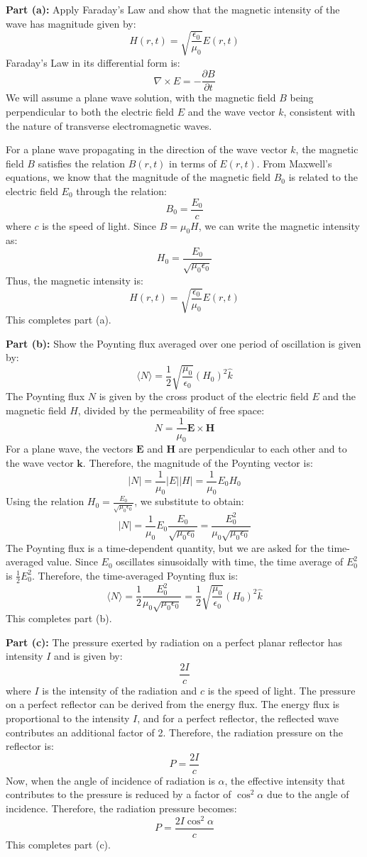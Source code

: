 \documentclass{article}
\begin{document}
\textbf{Part (a):} Apply Faraday's Law and show that the magnetic intensity of the wave has magnitude given by:
\[
H(r, t) = \sqrt{\frac{\epsilon_0}{\mu_0}} E(r, t)
\]
Faraday's Law in its differential form is:
\[
\nabla \times E = - \frac{\partial B}{\partial t}
\]
We will assume a plane wave solution, with the magnetic field \( B \) being perpendicular to both the electric field \( E \) and the wave vector \( k \), consistent with the nature of transverse electromagnetic waves.

For a plane wave propagating in the direction of the wave vector \( k \), the magnetic field \( B \) satisfies the relation \( B(r, t) \) in terms of \( E(r, t) \). From Maxwell's equations, we know that the magnitude of the magnetic field \( B_0 \) is related to the electric field \( E_0 \) through the relation:
\[
B_0 = \frac{E_0}{c}
\]
where \( c \) is the speed of light. Since \( B = \mu_0 H \), we can write the magnetic intensity as:
\[
H_0 = \frac{E_0}{\sqrt{\mu_0 \epsilon_0}}
\]
Thus, the magnetic intensity is:
\[
H(r, t) = \sqrt{\frac{\epsilon_0}{\mu_0}} E(r, t)
\]
This completes part (a).

\textbf{Part (b):} Show the Poynting flux averaged over one period of oscillation is given by:
\[
\langle N \rangle = \frac{1}{2} \sqrt{\frac{\mu_0}{\epsilon_0}} (H_0)^2 \hat{k}
\]
The Poynting flux \( N \) is given by the cross product of the electric field \( E \) and the magnetic field \( H \), divided by the permeability of free space:
\[
N = \frac{1}{\mu_0} \mathbf{E} \times \mathbf{H}
\]
For a plane wave, the vectors \( \mathbf{E} \) and \( \mathbf{H} \) are perpendicular to each other and to the wave vector \( \mathbf{k} \). Therefore, the magnitude of the Poynting vector is:
\[
|N| = \frac{1}{\mu_0} |E| |H| = \frac{1}{\mu_0} E_0 H_0
\]
Using the relation \( H_0 = \frac{E_0}{\sqrt{\mu_0 \epsilon_0}} \), we substitute to obtain:
\[
|N| = \frac{1}{\mu_0} E_0 \frac{E_0}{\sqrt{\mu_0 \epsilon_0}} = \frac{E_0^2}{\mu_0 \sqrt{\mu_0 \epsilon_0}}
\]
The Poynting flux is a time-dependent quantity, but we are asked for the time-averaged value. Since \( E_0 \) oscillates sinusoidally with time, the time average of \( E_0^2 \) is \( \frac{1}{2} E_0^2 \). Therefore, the time-averaged Poynting flux is:
\[
\langle N \rangle = \frac{1}{2} \frac{E_0^2}{\mu_0 \sqrt{\mu_0 \epsilon_0}} = \frac{1}{2} \sqrt{\frac{\mu_0}{\epsilon_0}} (H_0)^2 \hat{k}
\]
This completes part (b).

\textbf{Part (c):} The pressure exerted by radiation on a perfect planar reflector has intensity \( I \) and is given by:
\[
\frac{2I}{c}
\]
where \( I \) is the intensity of the radiation and \( c \) is the speed of light. The pressure on a perfect reflector can be derived from the energy flux. The energy flux is proportional to the intensity \( I \), and for a perfect reflector, the reflected wave contributes an additional factor of 2. Therefore, the radiation pressure on the reflector is:
\[
P = \frac{2I}{c}
\]
Now, when the angle of incidence of radiation is \( \alpha \), the effective intensity that contributes to the pressure is reduced by a factor of \( \cos^2 \alpha \) due to the angle of incidence. Therefore, the radiation pressure becomes:
\[
P = \frac{2I \cos^2 \alpha}{c}
\]
This completes part (c).
\end{document}
